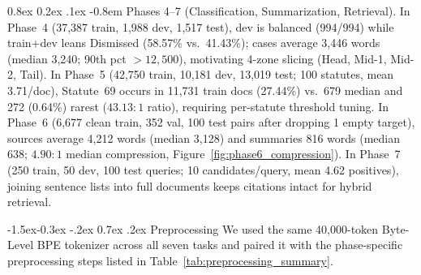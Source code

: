 \documentclass[11pt, oneside]{article}
\makeatletter
\renewcommand\subsection{\@startsection{subsection}{2}{\z@}%
  {-1.5ex\@plus -0.3ex \@minus -.2ex}%
  {0.7ex \@plus .2ex}%
  {\normalfont\large\bfseries}}
\renewcommand\paragraph{\@startsection{paragraph}{4}{\z@}%
  {0.8ex \@plus0.2ex \@minus.1ex}%
  {-0.8em}%
  {\normalfont\normalsize\bfseries}}
\makeatother
\begin{document}
\paragraph{Phases 4--7 (Classification, Summarization, Retrieval).}
In Phase~4 (37,387 train, 1,988 dev, 1,517 test), dev is balanced (994/994) while train+dev leans Dismissed (58.57\% vs.\ 41.43\%); cases average 3,446 words (median 3,240; 90th pct $>12,500$), motivating 4-zone slicing (Head, Mid-1, Mid-2, Tail). In Phase~5 (42,750 train, 10,181 dev, 13,019 test; 100 statutes, mean 3.71/doc), Statute~69 occurs in 11,731 train docs (27.44\%) vs.\ 679 median and 272 (0.64\%) rarest ($43.13:1$ ratio), requiring per-statute threshold tuning. In Phase~6 (6,677 clean train, 352 val, 100 test pairs after dropping 1 empty target), sources average 4,212 words (median 3,128) and summaries 816 words (median 638; $4.90:1$ median compression, Figure~\ref{fig:phase6_compression}). In Phase~7 (250 train, 50 dev, 100 test queries; 10 candidates/query, mean 4.62 positives), joining sentence lists into full documents keeps citations intact for hybrid retrieval.

\subsection{Preprocessing}
We used the same 40,000-token Byte-Level BPE tokenizer across all seven tasks and paired it with the phase-specific preprocessing steps listed in Table~\ref{tab:preprocessing_summary}.
\end{document}
